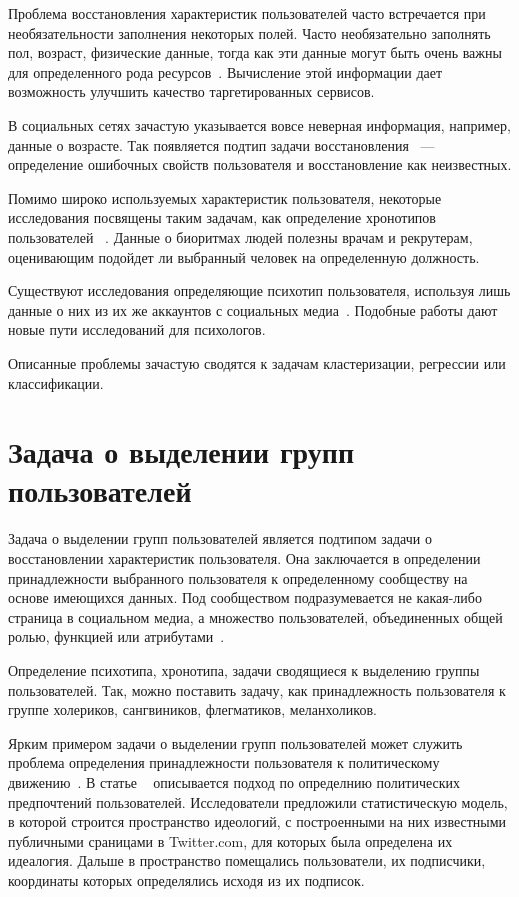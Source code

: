 \documentclass[annotation,times,page4]{itmo-student-thesis}
\begin{document}
Проблема восстановления характеристик пользователей часто встречается при необязательности заполнения некоторых полей. Часто необязательно заполнять пол, возраст, физические данные, тогда как эти данные могут быть очень важны для определенного рода ресурсов~\cite{peersman2011predicting, turdakov2013opredelenie, schwartz2013personality}. Вычисление этой информации дает возможность улучшить качество таргетированных сервисов.

В социальных сетях зачастую указывается вовсе неверная информация, например, данные о возрасте. Так появляется подтип задачи восстановления ~--- определение ошибочных свойств пользователя и восстановление как неизвестных.

Помимо широко используемых характеристик пользователя, некоторые исследования посвящены таким задачам, как определение хронотипов пользователей ~\cite{blachnio2015facebook}. Данные о биоритмах людей полезны врачам и рекрутерам, оценивающим подойдет ли выбранный человек на определенную должность.

Существуют исследования определяющие психотип пользователя, используя лишь данные о них из их же аккаунтов с социальных медиа~\cite{schwartz2013personality}. Подобные работы дают новые пути исследований для психологов.

Описанные проблемы зачастую сводятся к задачам кластеризации, регрессии или классификации.

\section{Задача о выделении групп пользователей}
Задача о выделении групп пользователей является подтипом задачи о восстановлении характеристик пользователя. Она заключается в определении принадлежности выбранного пользователя к определенному сообществу на основе имеющихся данных. Под сообществом подразумевается не какая-либо страница в социальном медиа, а множество пользователей, объединенных общей ролью, функцией или атрибутами~\cite{korshunov2013tasks}.

Определение психотипа, хронотипа, задачи сводящиеся к выделению группы пользователей. Так, можно поставить задачу, как принадлежность пользователя к группе холериков, сангвиников, флегматиков, меланхоликов.

Ярким примером задачи о выделении групп пользователей может служить проблема определения принадлежности пользователя к политическому движению~\cite{barbera2015tweeting, yardi2010dynamic, lo2014common, bonica2013ideology, gruzd2014investigating}. В статье ~\cite{barbera2015tweeting} описывается подход по определнию политических предпочтений пользователей. Исследователи предложили статистическую модель, в которой строится пространство идеологий, с построенными на них известными публичными сраницами в Twitter.com, для которых была определена их идеалогия. Дальше в пространство помещались пользователи, их подписчики, координаты которых определялись исходя из их подписок.
\end{document}
